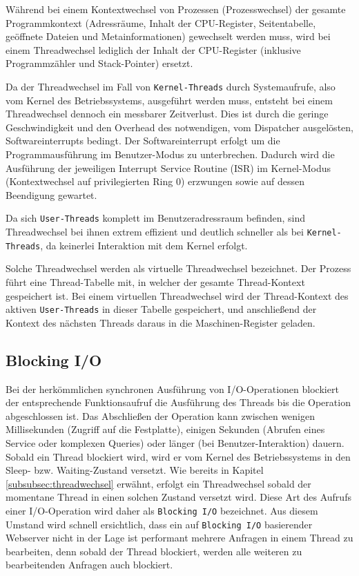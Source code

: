 Während bei einem Kontextwechsel von Prozessen (Prozesswechsel) der gesamte Programmkontext (Adressräume, Inhalt der CPU-Register,
Seitentabelle, geöffnete Dateien und Metainformationen)
gewechselt werden muss, wird bei einem Threadwechsel lediglich der Inhalt der CPU-Register (inklusive Programmzähler und Stack-Pointer)
ersetzt.\parencite{Mosberger2002}

Da der Threadwechsel im Fall von \verb|Kernel-Threads| durch Systemaufrufe, also vom Kernel des Betriebssystems, ausgeführt werden muss, entsteht
bei einem Threadwechsel dennoch ein messbarer Zeitverlust.
Dies ist durch die geringe Geschwindigkeit und den Overhead des notwendigen, vom Dispatcher ausgelösten, Softwareinterrupts bedingt.
Der Softwareinterrupt erfolgt um die Programmausführung im Benutzer-Modus zu unterbrechen.
Dadurch wird die Ausführung der jeweiligen Interrupt Service Routine (ISR) im
Kernel-Modus (Kontextwechsel auf privilegierten Ring 0) erzwungen sowie auf dessen Beendigung gewartet.

Da sich \verb|User-Threads| komplett im Benutzeradressraum befinden, sind Threadwechsel
bei ihnen extrem effizient und deutlich schneller als bei \verb|Kernel-Threads|, da keinerlei Interaktion mit dem Kernel erfolgt.

Solche Threadwechsel werden als virtuelle Threadwechsel bezeichnet.
Der Prozess führt eine Thread-Tabelle mit, in welcher der gesamte Thread-Kontext gespeichert ist.
Bei einem virtuellen Threadwechsel wird der Thread-Kontext des aktiven \verb|User-Threads| in dieser Tabelle gespeichert, und anschließend der Kontext
des nächsten Threads daraus in die Maschinen-Register geladen.
\parencite[Kapitel 2.4.6 und 2.2.4]{Tanenbaum2016}
\newpage
\subsection{Blocking I/O}
\label{subsec:blocking-i/o}
Bei der herkömmlichen synchronen Ausführung von I/O-Operationen blockiert der entsprechende Funktionsaufruf die Ausführung des
Threads bis die Operation abgeschlossen ist. Das Abschließen der Operation kann zwischen wenigen Millisekunden (Zugriff auf die Festplatte),
einigen Sekunden (Abrufen eines Service oder komplexen Queries) oder länger (bei Benutzer-Interaktion) dauern.
Sobald ein Thread blockiert wird, wird er vom Kernel des Betriebssystems in den Sleep- bzw. Waiting-Zustand versetzt.
Wie bereits in Kapitel \ref{subsubsec:threadwechsel} erwähnt, erfolgt ein Threadwechsel sobald der momentane Thread in einen solchen Zustand
versetzt wird.
Diese Art des Aufrufs einer I/O-Operation wird daher als \verb|Blocking I/O| bezeichnet.
Aus diesem Umstand wird schnell ersichtlich, dass ein auf \verb|Blocking I/O| basierender Webserver nicht in der Lage ist
performant mehrere Anfragen in einem Thread zu bearbeiten, denn sobald der Thread blockiert, werden alle weiteren zu bearbeitenden Anfragen
auch blockiert.
